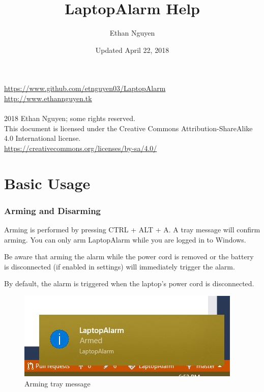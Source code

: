 \documentclass[12pt, letterpaper]{article}
\begin{document}
\begin{titlepage}
\title{LaptopAlarm Help}
\author{Ethan Nguyen}
\date{Updated April 22, 2018}
\maketitle
\thispagestyle{empty}

\vfill

\url{https://www.github.com/etnguyen03/LaptopAlarm} \\
\url{http://www.ethannguyen.tk}
\\
\\
\textcopyright{} 2018 Ethan Nguyen; some rights reserved. \\
This document is licensed under the Creative Commons Attribution-ShareAlike 4.0 International license. \\

\url{https://creativecommons.org/licenses/by-sa/4.0/}

\end{titlepage}

\tableofcontents
\pagebreak

\part{Basic Usage}
\section{Arming and Disarming}
Arming is performed by pressing CTRL + ALT + A. A tray message will confirm arming. You can only arm LaptopAlarm while you are logged in to Windows.

Be aware that arming the alarm while the power cord is removed or the battery is disconnected (if enabled in settings) will immediately trigger the alarm.

By default, the alarm is triggered when the laptop's power cord is disconnected.

\begin{figure}[H]
  \caption{Arming tray message}
  \centering
    \includegraphics{figures/figure01.JPG}
\end{figure}
\end{document}
